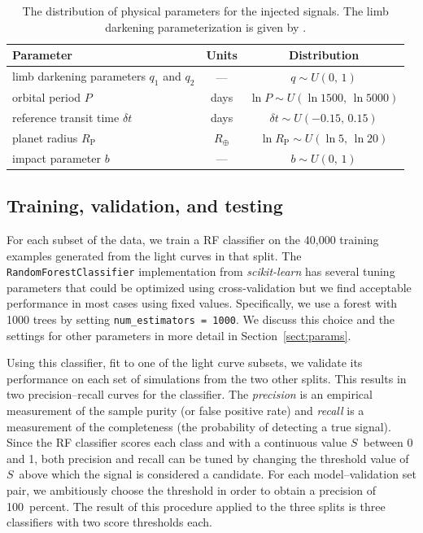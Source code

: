 \documentclass[12pt,preprint]{aastex}
\newcommand{\project}[1]{\textsl{#1}}
\newcommand{\tablabel}[1]{\label{tab:#1}}
\newcommand{\sectionname}{Section}
\newcommand{\sectref}[1]{\ref{sect:#1}}
\newcommand{\Sect}[1]{\sectionname~\sectref{#1}}
\newcommand{\sect}[1]{\Sect{#1}}
\newcommand{\sectlabel}[1]{\label{sect:#1}}
\newcommand{\period}{{\ensuremath{P}}}
\newcommand{\rp}{{\ensuremath{R_\mathrm{P}}}}
\newcommand{\score}{{\ensuremath{S}}}
\begin{document}
\begin{table}[htbp]
\begin{center}
\begin{tabular}{lcc}
\toprule
Parameter & Units & Distribution \\
\midrule

limb darkening parameters $q_1$ and $q_2$ & --- & $q \sim U(0,\,1)$ \\
orbital period \period & days & $\ln \period \sim U(\ln 1500,\,\ln 5000)$ \\
reference transit time $\delta t$ & days & $\delta t \sim U(-0.15,\,0.15)$ \\
planet radius \rp & $R_\oplus$ & $\ln \rp \sim U(\ln 5,\,\ln 20)$ \\
impact parameter $b$ & --- & $b \sim U(0,\,1)$ \\

\bottomrule
\end{tabular}
\end{center}
\caption{%
The distribution of physical parameters for the injected signals.
The limb darkening parameterization is given by \citet{Kipping:2013}.
\tablabel{params}}
\end{table}


\subsection{Training, validation, and testing}\sectlabel{train}

For each subset of the data, we train a RF classifier on the 40,000 training
examples generated from the light curves in that split.
The \texttt{RandomForestClassifier} implementation from \project{scikit-learn}
has several tuning parameters that could be optimized using cross-validation
but we find acceptable performance in most cases using fixed values.
Specifically, we use a forest with 1000 trees by setting
\texttt{num\_estimators = 1000}.
We discuss this choice and the settings for other parameters in more detail in
\sect{params}.

Using this classifier, fit to one of the light curve subsets, we validate its
performance on each set of simulations from the two other splits.
This results in two precision--recall curves for the classifier.
The \emph{precision} is an empirical measurement of the sample purity (or
false positive rate) and \emph{recall} is a measurement of the completeness
(the probability of detecting a true signal).
Since the RF classifier scores each class and with a continuous value \score\
between 0 and 1, both precision and recall can be tuned by changing the
threshold value of \score\ above which the signal is considered a candidate.
For each model--validation set pair, we ambitiously choose the threshold in
order to obtain a precision of 100~percent.
The result of this procedure applied to the three splits is three classifiers
with two score thresholds each.
\end{document}
